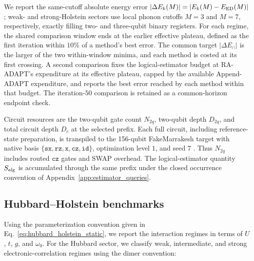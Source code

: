 \documentclass[
  reprint,
  amsmath,
  amssymb,
  aps,
  pra,
  nofootinbib,
  superscriptaddress,
  floatfix
]{revtex4-2}
\begin{document}
We report the same-cutoff absolute energy error
\(\lvert\Delta E_k(M)\rvert=\lvert E_k(M)-E_{\rm ED}(M)\rvert\)
\cite{Weisse2008}; weak- and
strong-Holstein sectors use local phonon cutoffs \(M=3\) and \(M=7\),
respectively, exactly filling two- and three-qubit binary registers.
For each regime, the shared comparison window ends at the earlier effective
plateau, defined as the first iteration within \(10\%\) of a method's best
error. The common target \(\lvert\Delta E_\cap\rvert\) is the larger of the
two within-window minima, and each method is costed at its first crossing. A
second comparison fixes the logical-estimator budget at RA-ADAPT's expenditure
at its effective plateau, capped by the available Append-ADAPT expenditure,
and reports the best error reached by each method within that budget. The
iteration-\(50\) comparison is retained as a common-horizon endpoint check.

Circuit resources are the two-qubit gate count \(N_{2q}\), two-qubit depth
\(D_{2q}\), and total circuit depth \(D_c\) at the selected prefix. Each full circuit, including reference-state
preparation, is transpiled to the 156-qubit FakeMarrakesh target with native
basis \(\{\mathtt{sx},\mathtt{rz},\mathtt{x},\mathtt{cz},\mathtt{id}\}\),
optimization level \(1\), and seed \(7\)
\cite{JavadiAbhari2024Qiskit,QiskitAlgorithmsAdaptVQE}. Thus \(N_{2q}\)
includes routed \(\mathtt{cz}\) gates and SWAP overhead. The logical-estimator
quantity \(S_{\rm alg}\) is accumulated through the same prefix under the
closed occurrence convention of Appendix~\ref{app:estimator_queries}.


\subsection{Hubbard--Holstein benchmarks}
Using the parameterization convention given in Eq.~\eqref{eq:hubbard_holstein_static}, we report the interaction regimes in terms of \(U\), \(t\), \(g\), and \(\omega_0\).
For the Hubbard sector, we classify weak, intermediate, and strong electronic-correlation regimes using the dimer convention:
\end{document}
